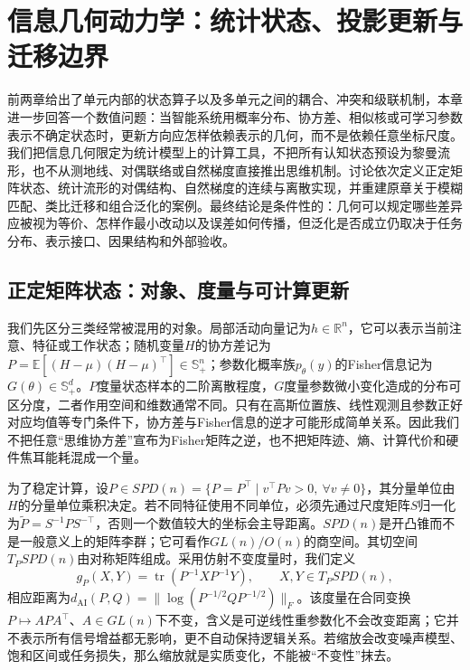 \chapter{信息几何动力学：统计状态、投影更新与迁移边界}
\label{chp:info_geometry_dynamics}

前两章给出了单元内部的状态算子以及多单元之间的耦合、冲突和级联机制，本章进一步回答一个数值问题：当智能系统用概率分布、协方差、相似核或可学习参数表示不确定状态时，更新方向应怎样依赖表示的几何，而不是依赖任意坐标尺度。我们把信息几何限定为统计模型上的计算工具，不把所有认知状态预设为黎曼流形，也不从测地线、对偶联络或自然梯度直接推出思维机制。讨论依次定义正定矩阵状态、统计流形的对偶结构、自然梯度的连续与离散实现，并重建原章关于模糊匹配、类比迁移和组合泛化的案例。最终结论是条件性的：几何可以规定哪些差异应被视为等价、怎样作最小改动以及误差如何传播，但泛化是否成立仍取决于任务分布、表示接口、因果结构和外部验收。

\section{正定矩阵状态：对象、度量与可计算更新}
\label{sec:section_3075}

我们先区分三类经常被混用的对象。局部活动向量记为$h\in\mathbb R^n$，它可以表示当前注意、特征或工作状态；随机变量$H$的协方差记为$P=\mathbb E[(H-\mu)(H-\mu)^\top]\in\mathbb S_+^n$；参数化概率族$p_\theta(y)$的Fisher信息记为$G(\theta)\in\mathbb S_+^d$。$P$度量状态样本的二阶离散程度，$G$度量参数微小变化造成的分布可区分度，二者作用空间和维数通常不同。只有在高斯位置族、线性观测且参数正好对应均值等专门条件下，协方差与Fisher信息的逆才可能形成简单关系。因此我们不把任意“思维协方差”宣布为Fisher矩阵之逆，也不把矩阵迹、熵、计算代价和硬件焦耳能耗混成一个量。

为了稳定计算，设$P\in SPD(n)=\{P=P^\top\mid v^\top Pv>0,\ \forall v\neq0\}$，其分量单位由$H$的分量单位乘积决定。若不同特征使用不同单位，必须先通过尺度矩阵$S$归一化为$\widetilde P=S^{-1}PS^{-\top}$，否则一个数值较大的坐标会主导距离。$SPD(n)$是开凸锥而不是一般意义上的矩阵李群；它可看作$GL(n)/O(n)$的商空间。其切空间$T_PSPD(n)$由对称矩阵组成。采用仿射不变度量时，我们定义
\begin{equation}
g_P(X,Y)=\operatorname{tr}(P^{-1}XP^{-1}Y),\qquad X,Y\in T_PSPD(n),
\label{eq:spd_metric_dynamics}
\end{equation}
相应距离为$d_{\mathrm{AI}}(P,Q)=\|\log(P^{-1/2}QP^{-1/2})\|_F$。该度量在合同变换$P\mapsto APA^\top$、$A\in GL(n)$下不变，含义是可逆线性重参数化不会改变距离；它并不表示所有信号增益都无影响，更不自动保持逻辑关系。若缩放会改变噪声模型、饱和区间或任务损失，那么缩放就是实质变化，不能被“不变性”抹去。

